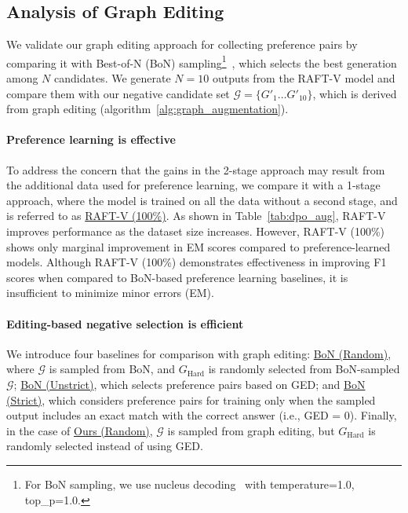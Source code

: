 
\subsection{\label{sec:data_augmentation}Analysis of Graph Editing}
We validate our graph editing approach for collecting preference pairs by comparing it with Best-of-N (BoN) sampling\footnote{For BoN sampling, we use nucleus decoding~\citep{Holtzman2020The} with temperature=1.0, top\_p=1.0.}~\citep{10.5555/3495724.3495977, snell2025scaling}, which selects the best generation among $N$ candidates.
We generate $N=10$ outputs from the RAFT-V model and compare them with our negative candidate set $\mathcal{G}=\{G'_1\dots G'_{10}\}$, which is derived from graph editing (algorithm~\ref{alg:graph_augmentation}).

\paragraph{Preference learning is effective}
To address the concern that the gains in the 2-stage approach may result from the additional data used for preference learning, we compare it with a 1-stage approach, where the model is trained on all the data without a second stage, and is referred to as \underline{RAFT-V (100\%)}. As shown in Table~\ref{tab:dpo_aug}, RAFT-V improves performance as the dataset size increases. However, RAFT-V (100\%) shows only marginal improvement in EM scores compared to preference-learned models. Although RAFT-V (100\%) demonstrates effectiveness in improving F1 scores when compared to BoN-based preference learning baselines, it is insufficient to minimize minor errors (EM).

\paragraph{Editing-based negative selection is efficient}
We introduce four baselines for comparison with graph editing: \underline{BoN (Random)}, where $\mathcal{G}$ is sampled from BoN, and $G_{\text{Hard}}$ is randomly selected from BoN-sampled $\mathcal{G}$; \underline{BoN (Unstrict)}, which selects preference pairs based on GED; and \underline{BoN (Strict)}, which considers preference pairs for training only when the sampled output includes an exact match with the correct answer (i.e., GED = 0).  Finally, in the case of \underline{Ours (Random)}, $\mathcal{G}$ is sampled from graph editing, but $G_{\text{Hard}}$ is randomly selected instead of using GED.

